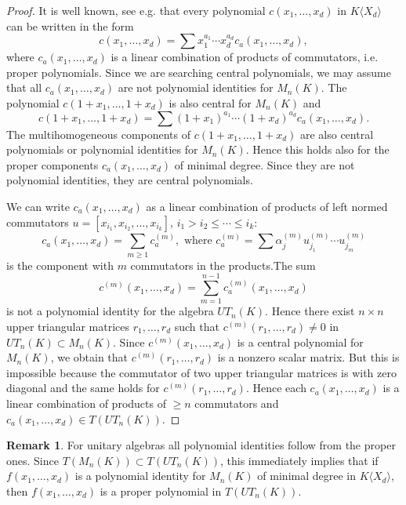 \documentclass[12pt]{amsart}
\theoremstyle{definition}
\newtheorem{remark}[theorem]{Remark}
\begin{document}
\begin{proof}
It is well known, see e.g. \cite[Proposition 4.3.3]{Dr3} that every polynomial $c(x_1,\ldots,x_d)$ in $K\langle X_d\rangle$ can be written in the form
\[
c(x_1,\ldots,x_d)=\sum x_1^{a_1}\cdots x_d^{a_d}c_a(x_1,\ldots,x_d),
\]
where $c_a(x_1,\ldots,x_d)$ is a linear combination of products of commutators, i.e. proper polynomials. Since we are searching central polynomials, we may assume that
all $c_a(x_1,\ldots,x_d)$ are not polynomial identities for $M_n(K)$. The polynomial $c(1+x_1,\ldots,1+x_d)$ is also central for $M_n(K)$ and
\[
c(1+x_1,\ldots,1+x_d)=\sum (1+x_1)^{a_1}\cdots (1+x_d)^{a_d}c_a(x_1,\ldots,x_d).
\]
The multihomogeneous components of $c(1+x_1,\ldots,1+x_d)$ are also central polynomials or polynomial identities for $M_n(K)$.
Hence this holds also for the proper components $c_a(x_1,\ldots,x_d)$ of minimal degree. Since they are not polynomial identities, they are central polynomials.

We can write $c_a(x_1,\ldots,x_d)$ as a linear combination of products of left normed commutators
$u=[x_{i_1},x_{i_2},\ldots,x_{i_k}]$, $i_1>i_2\leq\cdots\leq i_k$:
\[
c_a(x_1,\ldots,x_d)=\sum_{m\geq 1}c_a^{(m)},\text{ where }
c_a^{(m)}=\sum\alpha^{(m)}_ju^{(m)}_{j_1}\cdots u^{(m)}_{j_m}
\]
is the component with $m$ commutators in the products.The sum
\[
c^{(m)}(x_1,\ldots,x_d)=\sum_{m=1}^{n-1}c_a^{(m)}(x_1,\ldots,x_d)
\]
is not a polynomial identity for the algebra $UT_n(K)$. Hence there exist $n\times n$ upper triangular matrices $r_1,\ldots,r_d$ such that
$c^{(m)}(r_1,\ldots,r_d)\not=0$ in $UT_n(K)\subset M_n(K)$. Since $c^{(m)}(x_1,\ldots,x_d)$ is a central polynomial for $M_n(K)$, we obtain that
$c^{(m)}(r_1,\ldots,r_d)$ is a nonzero scalar matrix. But this is impossible because the commutator of two upper triangular matrices is with zero diagonal
and the same holds for $c^{(m)}(r_1,\ldots,r_d)$.
Hence each $c_a(x_1,\ldots,x_d)$ is a linear combination of products of $\geq n$ commutators and $c_a(x_1,\ldots,x_d)\in T(UT_n(K))$.
\end{proof}

\begin{remark}\label{reduction to proper PI}
For unitary algebras all polynomial identities follow from the proper ones. Since
$T(M_n(K))\subset T(UT_n(K))$, this immediately implies that if
$f(x_1,\ldots,x_d)$ is a polynomial identity for $M_n(K)$ of minimal degree in $K\langle X_d\rangle$, then
$f(x_1,\ldots,x_d)$ is a proper polynomial in $T(UT_n(K))$.
\end{remark}
\end{document}
